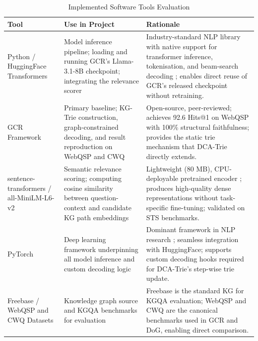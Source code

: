 \begin{table}[t]
	\centering
	\small
	\setlength{\tabcolsep}{4pt}
	\caption{Implemented Software Tools Evaluation}
	\label{tab:implemented-software-tools}
	\begin{tabular}{p{}p{}p{}}
		\toprule
		Tool                                     & Use in Project                                                                                                    & Rationale                                                                                                                                                                                                               \\
		\midrule
		Python / HuggingFace Transformers        & Model inference pipeline; loading and running GCR's Llama-3.1-8B checkpoint; integrating the relevance scorer     & Industry-standard NLP library with native support for transformer inference, tokenisation, and beam-search decoding \citep{wolf2020transformers}; enables direct reuse of GCR's released checkpoint without retraining. \\
		GCR Framework \citep{luo2024gcr}         & Primary baseline; KG-Trie construction, graph-constrained decoding, and result reproduction on WebQSP and CWQ     & Open-source, peer-reviewed; achieves 92.6 Hits@1 on WebQSP with 100\% structural faithfulness; provides the static trie mechanism that DCA-Trie directly extends.                                                       \\
		sentence-transformers / all-MiniLM-L6-v2 & Semantic relevance scoring; computing cosine similarity between question-context and candidate KG path embeddings & Lightweight (80 MB), CPU-deployable pretrained encoder \citep{reimers2019sentence}; produces high-quality dense representations without task-specific fine-tuning; validated on STS benchmarks.                         \\
		PyTorch                                  & Deep learning framework underpinning all model inference and custom decoding logic                                & Dominant framework in NLP research \citep{paszke2019pytorch}; seamless integration with HuggingFace; supports custom decoding hooks required for DCA-Trie's step-wise trie update.                                      \\
		Freebase / WebQSP and CWQ Datasets       & Knowledge graph source and KGQA benchmarks for evaluation                                                         & Freebase \citep{bollacker2008freebase} is the standard KG for KGQA evaluation; WebQSP \citep{yih2016value} and CWQ \citep{talmor2018web} are the canonical benchmarks used in GCR and DoG, enabling direct comparison.  \\

\end{tabular}
\end{table}
